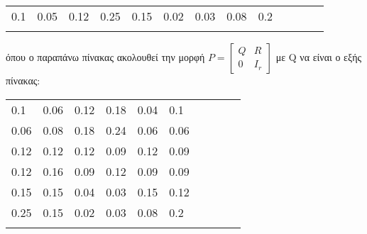 \begin{table}[h]
\begin{tabular}{lllllllllllll}
    \multicolumn{1}{|l|}{0.1}  & \multicolumn{1}{l|}{0.05} & \multicolumn{1}{l|}{0.12} & \multicolumn{1}{l|}{0.25} & \multicolumn{1}{l|}{0.15} & \multicolumn{1}{l|}{0.02} & \multicolumn{1}{l|}{0.03} & \multicolumn{1}{l|}{0.08} & \multicolumn{1}{l|}{0.2}  &  &  &  &  \\ \cline{1-9}
                               &                           &                           &                           &                           &                           &                           &                           &                           &  &  &  & 
    \end{tabular}
\end{table}

όπου ο παραπάνω πίνακας ακολουθεί την μορφή  $P =\begin{bmatrix} Q & R \\
                                                                 0 & I_r   
                                                                
                                                \end{bmatrix} 
                                               $ με Q να είναι ο εξής πίνακας:

\begin{table}[h]
\begin{tabular}{llllllllll}
\cline{1-6}
\multicolumn{1}{|l|}{0.1}  & \multicolumn{1}{l|}{0.06} & \multicolumn{1}{l|}{0.12} & \multicolumn{1}{l|}{0.18} & \multicolumn{1}{l|}{0.04} & \multicolumn{1}{l|}{0.1}  &  &  &  &  \\ \cline{1-6}
\multicolumn{1}{|l|}{0.06} & \multicolumn{1}{l|}{0.08} & \multicolumn{1}{l|}{0.18} & \multicolumn{1}{l|}{0.24} & \multicolumn{1}{l|}{0.06} & \multicolumn{1}{l|}{0.06} &  &  &  &  \\ \cline{1-6}
\multicolumn{1}{|l|}{0.12} & \multicolumn{1}{l|}{0.12} & \multicolumn{1}{l|}{0.12} & \multicolumn{1}{l|}{0.09} & \multicolumn{1}{l|}{0.12} & \multicolumn{1}{l|}{0.09} &  &  &  &  \\ \cline{1-6}
\multicolumn{1}{|l|}{0.12} & \multicolumn{1}{l|}{0.16} & \multicolumn{1}{l|}{0.09} & \multicolumn{1}{l|}{0.12} & \multicolumn{1}{l|}{0.09} & \multicolumn{1}{l|}{0.09} &  &  &  &  \\ \cline{1-6}
\multicolumn{1}{|l|}{0.15} & \multicolumn{1}{l|}{0.15} & \multicolumn{1}{l|}{0.04} & \multicolumn{1}{l|}{0.03} & \multicolumn{1}{l|}{0.15} & \multicolumn{1}{l|}{0.12} &  &  &  &  \\ \cline{1-6}
\multicolumn{1}{|l|}{0.25} & \multicolumn{1}{l|}{0.15} & \multicolumn{1}{l|}{0.02} & \multicolumn{1}{l|}{0.03} & \multicolumn{1}{l|}{0.08} & \multicolumn{1}{l|}{0.2}  &  &  &  &  \\ \cline{1-6}
                        &                           &                           &                           &                           &                           &  &  &  & 
\end{tabular}
\end{table}


